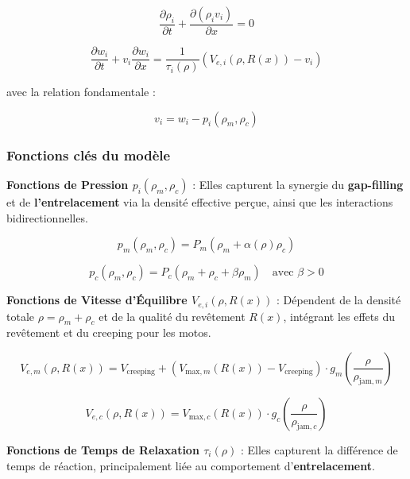 \begin{equation}
    \frac{\partial \rho_i}{\partial t} + \frac{\partial (\rho_i v_i)}{\partial x} = 0
\end{equation}

\begin{equation}
    \frac{\partial w_i}{\partial t} + v_i \frac{\partial w_i}{\partial x} = \frac{1}{\tau_i(\rho)} (V_{e,i}(\rho, R(x)) - v_i)
\end{equation}

avec la relation fondamentale :

\begin{equation}
    v_i = w_i - p_i(\rho_m, \rho_c)
\end{equation}

\subsubsection{Fonctions clés du modèle}
\textbf{Fonctions de Pression $p_i(\rho_m, \rho_c)$} : Elles capturent la synergie du \textbf{gap-filling} et de \textbf{l'entrelacement} via la densité effective perçue, ainsi que les interactions bidirectionnelles.

\begin{equation}
    p_m(\rho_m, \rho_c) = P_m(\rho_m + \alpha(\rho) \rho_c)
\end{equation}

\begin{equation}
    p_c(\rho_m, \rho_c) = P_c(\rho_m + \rho_c + \beta \rho_m) \quad \text{avec } \beta > 0
\end{equation}

\textbf{Fonctions de Vitesse d'Équilibre $V_{e,i}(\rho, R(x))$} : Dépendent de la densité totale $\rho = \rho_m + \rho_c$ et de la qualité du revêtement $R(x)$, intégrant les effets du revêtement et du creeping pour les motos.

\begin{equation}
    V_{e,m}(\rho, R(x)) = V_{\text{creeping}} + \left(V_{\text{max},m}(R(x)) - V_{\text{creeping}}\right) \cdot g_m\left(\frac{\rho}{\rho_{\text{jam},m}}\right)
\end{equation}

\begin{equation}
    V_{e,c}(\rho, R(x)) = V_{\text{max},c}(R(x)) \cdot g_c\left(\frac{\rho}{\rho_{\text{jam},c}}\right)
\end{equation}

\textbf{Fonctions de Temps de Relaxation $\tau_i(\rho)$} : Elles capturent la différence de temps de réaction, principalement liée au comportement d'\textbf{entrelacement}.

